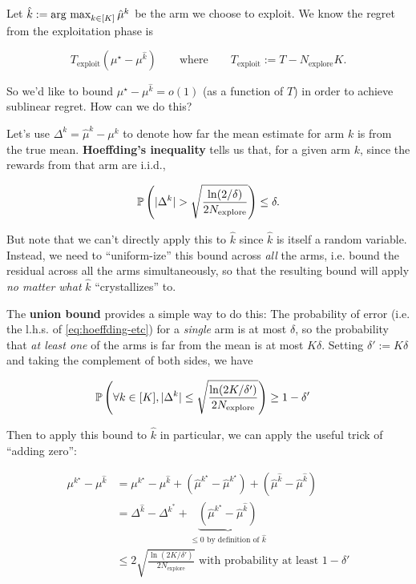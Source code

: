 \documentclass[../main/main]{subfiles}
\begin{document}
Let $\hat k := \argmax_{k \in [K]} \hat \mu^k$ be the arm we choose to exploit. We know the regret from the exploitation phase is

\[
    T_{\text{exploit}} (\mu^\star - \mu^{\hat k}) \qquad \text{where} \qquad T_{\text{exploit}} := T - N_{\text{explore}} K.
\]

So we'd like to bound $\mu^\star - \mu^{\hat k} = o(1)$ (as a function of $T$) in order to achieve sublinear regret. How can we do this?

Let's use $\Delta^k = \hat \mu^k - \mu^k$ to denote how far the mean estimate for arm $k$ is from the true mean. \textbf{Hoeffding's inequality}  tells us that, for a given arm $k$, since the rewards from that arm are i.i.d.,

\begin{equation}
    \P\left(|\Delta^k | > \sqrt{\frac{\ln(2/\delta)}{2N_{\text{explore}}}} \right) \le \delta. \label{eq:hoeffding-etc}
\end{equation}


But note that we can't directly apply this to $\hat k$ since $\hat k$ is itself a random variable. Instead, we need to ``uniform-ize'' this bound across \emph{all} the arms, i.e. bound the residual across all the arms simultaneously, so that the resulting bound will apply \emph{no matter what} $\hat k$ ``crystallizes'' to.

The \textbf{union bound} provides a simple way to do this: The probability of error (i.e. the l.h.s. of \ref*{eq:hoeffding-etc}) for a \emph{single} arm is at most $\delta$, so the probability that \emph{at least one} of the arms is far from the mean is at most $K \delta$. Setting $\delta' := K \delta$ and taking the complement of both sides, we have

\begin{align*}
    \P\left( \forall k \in [K], |\Delta^k | \le \sqrt{\frac{\ln(2K/\delta')}{2N_{\text{explore}}}} \right) &\ge 1-\delta'
\end{align*}

Then to apply this bound to $\hat k$ in particular, we can apply the useful trick of ``adding zero'':

\begin{align*}
    \mu^{k^\star} - \mu^{\hat k} &= \mu^{k^\star} - \mu^{\hat k} + (\hat \mu^{k^\star} - \hat \mu^{k^\star}) + (\hat \mu^{\hat k} - \hat \mu^{\hat k}) \\
    &= \Delta^{\hat k} - \Delta^{k^*} + \underbrace{(\hat \mu^{k^\star} - \hat \mu^{\hat k})}_{\le 0 \text{ by definition of } \hat k} \\
    &\le 2 \sqrt{\frac{\ln(2K/\delta')}{2N_{\text{explore}}}} \text{ with probability at least } 1-\delta'
\end{align*}
\end{document}
